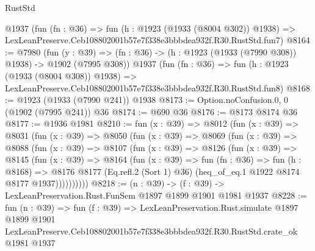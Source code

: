 \begin{lexlean}{RustStd}
\begin{coremodule}
    @1937
    (fun (fn : @36) =>
    fun (h : @1923 (@1933 (@8004 @302)) @1938) =>
    LexLeanPreserve.Ceb108802001b57e7f338e3bbbdea932f.R30.RustStd.fun7)
@8164 := @7980
    (fun (y : @39) => (fn : @36) -> (h : @1923 (@1933 (@7990 @308)) @1938) -> @1902 (@7995 @308))
    @1937
    (fun (fn : @36) =>
    fun (h : @1923 (@1933 (@8004 @308)) @1938) =>
    LexLeanPreserve.Ceb108802001b57e7f338e3bbbdea932f.R30.RustStd.fun8)
@8168 := @1923 (@1933 (@7990 @241)) @1938
@8173 := Option.noConfusion.{0, 0} (@1902 (@7995 @241)) @36
@8174 := @690 @36
@8176 := @8173 @8174 @36
@8177 := @1936 @1981
@8210 := fun (x : @39) =>
  @8012
    (fun (x : @39) =>
    @8031
      (fun (x : @39) =>
      @8050
        (fun (x : @39) =>
        @8069
          (fun (x : @39) =>
          @8088
            (fun (x : @39) =>
            @8107
              (fun (x : @39) =>
              @8126
                (fun (x : @39) =>
                @8145
                  (fun (x : @39) =>
                  @8164
                    (fun (x : @39) =>
                    fun (fn : @36) =>
                    fun (h : @8168) =>
                    @8176
                      @8177
                      (Eq.refl.{2} (Sort 1) @36)
                      (heq_of_eq.{1} @1922 @8174 @8177 @1937))))))))))
@8218 := (n : @39) -> (f : @39) -> LexLeanPreservation.Rust.FunSem @1897 @1899 @1901 @1981 @1937
@8228 := fun (n : @39) =>
  fun (f : @39) =>
  LexLeanPreservation.Rust.simulate
    @1897
    @1899
    @1901
    LexLeanPreserve.Ceb108802001b57e7f338e3bbbdea932f.R30.RustStd.crate_ok
    @1981
    @1937
\end{coremodule}
\end{lexlean}
